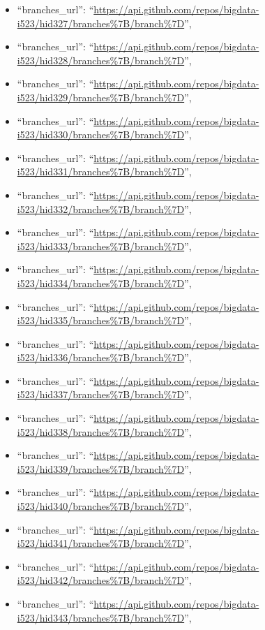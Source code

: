 \begin{itemize}
\item
  ``branches\_url'':
  ``\url{https://api.github.com/repos/bigdata-i523/hid327/branches\%7B/branch\%7D}'',
\item
  ``branches\_url'':
  ``\url{https://api.github.com/repos/bigdata-i523/hid328/branches\%7B/branch\%7D}'',
\item
  ``branches\_url'':
  ``\url{https://api.github.com/repos/bigdata-i523/hid329/branches\%7B/branch\%7D}'',
\item
  ``branches\_url'':
  ``\url{https://api.github.com/repos/bigdata-i523/hid330/branches\%7B/branch\%7D}'',
\item
  ``branches\_url'':
  ``\url{https://api.github.com/repos/bigdata-i523/hid331/branches\%7B/branch\%7D}'',
\item
  ``branches\_url'':
  ``\url{https://api.github.com/repos/bigdata-i523/hid332/branches\%7B/branch\%7D}'',
\item
  ``branches\_url'':
  ``\url{https://api.github.com/repos/bigdata-i523/hid333/branches\%7B/branch\%7D}'',
\item
  ``branches\_url'':
  ``\url{https://api.github.com/repos/bigdata-i523/hid334/branches\%7B/branch\%7D}'',
\item
  ``branches\_url'':
  ``\url{https://api.github.com/repos/bigdata-i523/hid335/branches\%7B/branch\%7D}'',
\item
  ``branches\_url'':
  ``\url{https://api.github.com/repos/bigdata-i523/hid336/branches\%7B/branch\%7D}'',
\item
  ``branches\_url'':
  ``\url{https://api.github.com/repos/bigdata-i523/hid337/branches\%7B/branch\%7D}'',
\item
  ``branches\_url'':
  ``\url{https://api.github.com/repos/bigdata-i523/hid338/branches\%7B/branch\%7D}'',
\item
  ``branches\_url'':
  ``\url{https://api.github.com/repos/bigdata-i523/hid339/branches\%7B/branch\%7D}'',
\item
  ``branches\_url'':
  ``\url{https://api.github.com/repos/bigdata-i523/hid340/branches\%7B/branch\%7D}'',
\item
  ``branches\_url'':
  ``\url{https://api.github.com/repos/bigdata-i523/hid341/branches\%7B/branch\%7D}'',
\item
  ``branches\_url'':
  ``\url{https://api.github.com/repos/bigdata-i523/hid342/branches\%7B/branch\%7D}'',
\item
  ``branches\_url'':
  ``\url{https://api.github.com/repos/bigdata-i523/hid343/branches\%7B/branch\%7D}'',

\end{itemize}

